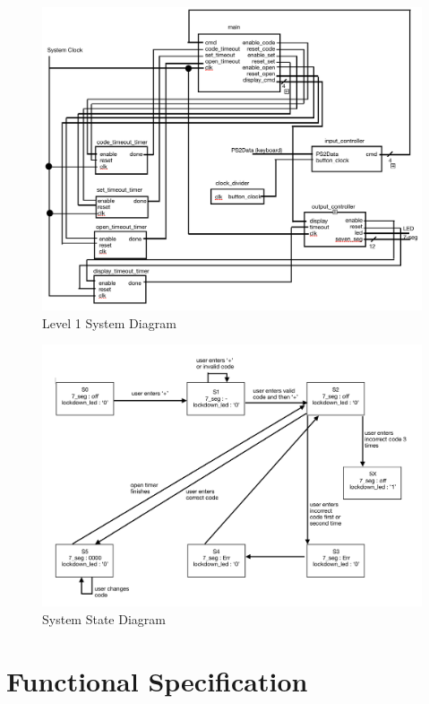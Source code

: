 \documentclass[11pt]{article}
\begin{document}
\begin{figure}[H]
\begin{center}
	\includegraphics[width=\textwidth]{./img/level1.png}
	\caption{\label{fig:level1}Level 1 System Diagram}
\end{center}
\end{figure}

\begin{figure}[H]
\begin{center}
	\includegraphics[width = \textwidth]{./img/statemachine.png}
	\caption{\label{fig:statemachine}System State Diagram}
\end{center}
\end{figure}

\section{Functional Specification}
\end{document}
